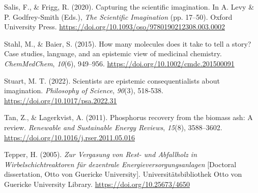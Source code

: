 \documentclass[authordate, anecdote]{jote-new-article}
\begin{document}
	Salis, F., \& Frigg, R. (2020). Capturing the scientific imagination. In A. Levy \& P. Godfrey-Smith (Eds.), \emph{The Scientific Imagination} (pp. 17--50). Oxford University Press. \url{https://doi.org/10.1093/oso/9780190212308.003.0002}



	Stahl, M., \& Baier, S. (2015). How many molecules does it take to tell a story? Case studies, language, and an epistemic view of medicinal chemistry. \emph{ChemMedChem}, \emph{10}(6), 949--956. \url{https://doi.org/10.1002/cmdc.201500091}



	Stuart, M. T. (2022). Scientists are epistemic consequentialists about imagination. \emph{Philosophy of Science}, \emph{90}(3), 518-538. \url{https://doi.org/10.1017/psa.2022.31}



	Tan, Z., \& Lagerkvist, A. (2011). Phosphorus recovery from the biomass ash: A review. \emph{Renewable and Sustainable Energy Reviews}, \emph{15}(8), 3588--3602. \url{https://doi.org/10.1016/j.rser.2011.05.016}



	Tepper, H. (2005). \emph{Zur Vergasung von Rest- und Abfallholz in Wirbelschichtreaktoren für dezentrale Energieversorgungsanlagen }[Doctoral dissertation, Otto von Guericke University]. Universitätsbibliothek Otto von Guericke University Library. \url{https://doi.org/10.25673/4650}
\end{document}
